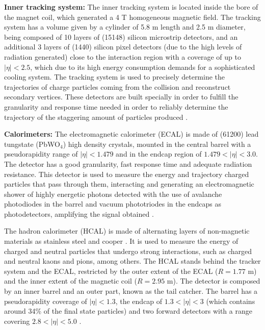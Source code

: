 \textbf{Inner tracking system:} The inner tracking system is located inside the bore of the magnet coil, which generated a 4 T homogeneous magnetic field. The tracking system has a volume given by a cylinder of 5.8 m length and 2.5 m diameter, being composed of 10 layers of (15148) silicon microstrip detectors, and an additional 3 layers of (1440) silicon pixel detectors (due to the high levels of radiation generated) close to the interaction region with a coverage of up to $|\eta| < 2.5$, which due to its high energy consumption demands for a sophisticated cooling system. The tracking system is used to precisely determine the trajectories of charge particles coming from the collision and reconstruct secondary vertices. These detectors are built specially in order to fulfill the granularity and response time needed in order to reliably determine the trajectory of the staggering amount of particles produced \cite{CMS}.

\textbf{Calorimeters:} The electromagnetic calorimeter (ECAL) is made of (61200) lead tungstate (PbWO$_4$) high density crystals, mounted in the central barrel with a pseudorapidity range of $|\eta| < 1.479$ and in the endcap region of $1.479 < |\eta| < 3.0$. The detector has a good granularity, fast response time and adequate radiation resistance. This detector is used to measure the energy and trajectory charged particles that pass through them, interacting and generating an electromagnetic shower of highly energetic photons detected with the use of avalanche photodiodes in the barrel and vacuum phototriodes in the endcaps as photodetectors, amplifying the signal obtained \cite{CMS}\cite{paperCMS}.

The hadron calorimeter (HCAL) is made of alternating layers of non-magnetic materials as stainless steel and cooper \cite{CMS}. It is used to measure the energy of charged and neutral particles that undergo strong interactions, such as charged and neutral kaons and pions, among others. The HCAL stands behind the tracker system and the ECAL, restricted by the outer extent of the ECAL ($R = 1.77$ m) and the inner extent of the magnetic coil ($R = 2.95$ m). The detector is composed by an inner barrel and an outer part, known as the tail catcher. The barrel has a pseudorapidity coverage of $|\eta| < 1.3$, the endcap of $1.3 < |\eta| < 3$ (which contains around 34\% of the final state particles) and two forward detectors with a range covering $2.8 < |\eta| < 5.0$ \cite{CMS}\cite{paperCMS}.

